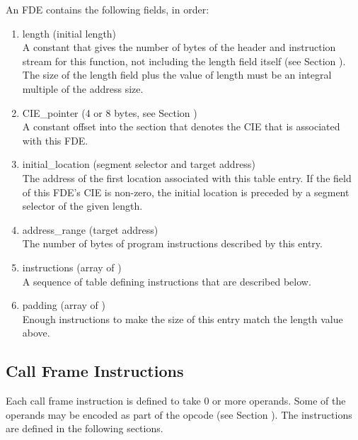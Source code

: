 An FDE contains the following fields, in order:
\begin{enumerate}[1. ]
\item length (initial length)  \\
A constant that gives the number of bytes of the header and
instruction stream for this function, not including the length
field itself 
(see Section ). 
The size of the length field
plus the value of length must be an integral multiple of the
address size.

\item   CIE\_pointer (4 or 8 bytes, see Section ) \\
A constant 
offset into the 
section that denotes
the CIE that is associated with this FDE.

\item  initial\_location (segment selector and target address) \\
The 
address of the first location associated with this table
entry. 
If the  field of this FDE's CIE is non-zero,
the initial location is preceded by a segment selector of
the given length.

\item  address\_range (target address) \\
The 
number 
of bytes of program instructions described by this entry.

\item instructions (array of ) \\
A sequence of table defining instructions that are described below.

\item padding (array of ) \\
Enough  instructions 
to make the size of this entry match the length value above.
\end{enumerate}

\subsection{Call Frame Instructions}
\label{chap:callframeinstructions}

Each call frame instruction is defined to take 0 or more
operands. Some of the operands may be encoded as part of the
opcode 
(see Section ). 
The instructions are defined in
the following sections.

